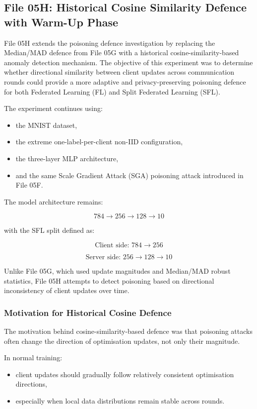 \subsection*{File 05H: Historical Cosine Similarity Defence with Warm-Up Phase}

File 05H extends the poisoning defence investigation by replacing the Median/MAD defence from File 05G with a historical cosine-similarity-based anomaly detection mechanism. The objective of this experiment was to determine whether directional similarity between client updates across communication rounds could provide a more adaptive and privacy-preserving poisoning defence for both Federated Learning (FL) and Split Federated Learning (SFL).

The experiment continues using:
\begin{itemize}
    \item the MNIST dataset,
    \item the extreme one-label-per-client non-IID configuration,
    \item the three-layer MLP architecture,
    \item and the same Scale Gradient Attack (SGA) poisoning attack introduced in File 05F.
\end{itemize}

The model architecture remains:

\[
784 \rightarrow 256 \rightarrow 128 \rightarrow 10
\]

with the SFL split defined as:

\[
\text{Client side: } 784 \rightarrow 256
\]

\[
\text{Server side: } 256 \rightarrow 128 \rightarrow 10
\]

Unlike File 05G, which used update magnitudes and Median/MAD robust statistics, File 05H attempts to detect poisoning based on directional inconsistency of client updates over time.

\subsubsection*{Motivation for Historical Cosine Defence}

The motivation behind cosine-similarity-based defence was that poisoning attacks often change the direction of optimisation updates, not only their magnitude.

In normal training:
\begin{itemize}
    \item client updates should gradually follow relatively consistent optimisation directions,
    \item especially when local data distributions remain stable across rounds.
\end{itemize}

